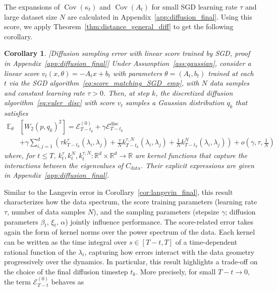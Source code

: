 \documentclass[11pt]{article}
\newtheorem{cor}{Corollary}
\newcommand{\RR}{\mathbb{R}}
\newcommand{\cov}{\operatorname{Cov}}
\begin{document}
The expansions of $\cov(\kappa_t)$ and $\cov(A_t)$ for small SGD learning rate $\tau$ and large dataset size $N$ are calculated in Appendix~\ref{app:diffusion_final}. Using this score, we apply Theorem~\ref{thm:distance_general_diff} to get the following corollary.%
\begin{cor}
\label{cor:diffusion_final}[Diffusion sampling error with linear score trained by SGD, proof in Appendix~\ref{app:diffusion_final}]
Under Assumption~\ref{ass:gaussian}, consider a linear score $v_t(x, \theta) = - A_t x + b_t$ with parameters \( \theta=(A_t,b_t)\) trained at each $t$ via the SGD algorithm~\eqref{eq:score_matching_SGD_emp}, with \( N \) data samples and constant learning rate \( \tau > 0 \). Then, at step $k$, the discretized diffusion algorithm~\eqref{eq:euler_disc} with score $v_t$ samples a Gaussian distribution $q_k$ that satisfies \vspace{-0.cm}
\begin{equation*}
\begin{split}
     \mathbb{E}_{\theta}&\left[W_2\left(p, q_k\right)^2\right] = 
 \mathcal{E}^{(0)}_{T-t_k} + \gamma \mathcal{E}^{\text{disc}}_{T-t_k} \\[-0.2cm] &+ \gamma \sum_{i,j = 1}^d \left(\tau k_{T-t_k}^\tau (\lambda_i, \lambda_j)  + \frac{\tau}{N} k_{T-t_k}^{\tau, N}(\lambda_i, \lambda_j) +\frac{1}{N} k_{T-t_k}^N(\lambda_i, \lambda_j)\right)  + o\left( \gamma, \tau, \frac{1}{N} \right)
\end{split} 
 \end{equation*}
where, for $t \leq T$, $k_t^\tau, k_t^N, k_t^{\tau, N} : \RR^d \times \RR^d \to \RR$ are kernel functions that capture the interactions between the eigenvalues of $C_\mathrm{data}$. Their explicit expressions are given in Appendix~\ref{app:diffusion_final}. 
\end{cor}
Similar to the Langevin error in Corollary~\ref{cor:langevin_final}, this result characterizes how the data spectrum, the score training parameters (learning rate $\tau$, number of data samples $N$), and the sampling parameters (stepsize $\gamma$; diffusion parameters $\beta_t$, $\xi_t$, $\alpha$) jointly influence performance. The score-related error takes again the form of kernel norms over the power spectrum of the data. Each kernel can be written as the time integral over \( s \in [T - t, T] \) of a time-dependent rational function of the \(\lambda_i\), capturing how errors interact with the data geometry progressively over the dynamics. In particular, this result highlights a trade-off on the choice of the final diffusion timestep $t_k$. More precisely, for small $T-t \to 0$, the term $\mathcal{E}^{(0)}_{T-t}$ behaves as
\end{document}
